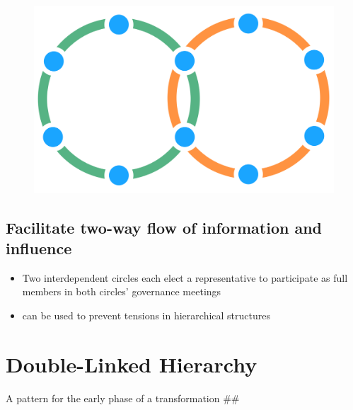 \begin{figure}[htbp]
\centering
\includegraphics[keepaspectratio,width=\textwidth,height=0.75\textheight]{img/structural-patterns/double-link.png}
\end{figure}

\subsection{Facilitate two-way flow of information and influence}
\label{facilitatetwo-wayflowofinformationandinfluence}

\begin{itemize}
\item Two interdependent circles each elect a representative to participate as full members in both circles' governance meetings

\item can be used to prevent tensions in hierarchical structures

\end{itemize}

\section{Double-Linked Hierarchy}
\label{double-linkedhierarchy}

A pattern for the early phase of a transformation \#\#

